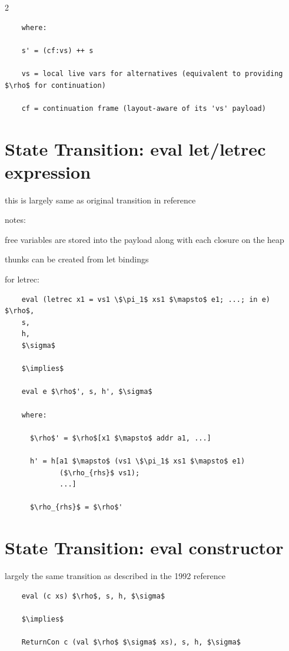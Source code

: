 \documentclass[8pt]{extarticle}
\begin{document}
\begin{multicols*}{2}
\begin{lstlisting}
    where:

    s' = (cf:vs) ++ s
    
    vs = local live vars for alternatives (equivalent to providing $\rho$ for continuation)
    
    cf = continuation frame (layout-aware of its 'vs' payload)
  \end{lstlisting}

  \section{State Transition: eval let/letrec expression}

  this is largely same as original transition in reference \cite{peyton1992}

  notes:

  free variables are stored into the payload along with each closure on the heap

  thunks can be created from let bindings
  
  for letrec:
  
  \begin{lstlisting}
    eval (letrec x1 = vs1 \$\pi_1$ xs1 $\mapsto$ e1; ...; in e) $\rho$,
    s,
    h,
    $\sigma$

    $\implies$

    eval e $\rho$', s, h', $\sigma$

    where:

      $\rho$' = $\rho$[x1 $\mapsto$ addr a1, ...]
      
      h' = h[a1 $\mapsto$ (vs1 \$\pi_1$ xs1 $\mapsto$ e1)
             ($\rho_{rhs}$ vs1);
             ...]

      $\rho_{rhs}$ = $\rho$'
  \end{lstlisting}

  \section{State Transition: eval constructor}

  largely the same transition as described in the 1992 reference \cite{peyton1992}

  \begin{lstlisting}
    eval (c xs) $\rho$, s, h, $\sigma$

    $\implies$

    ReturnCon c (val $\rho$ $\sigma$ xs), s, h, $\sigma$
  \end{lstlisting}

  \vfill\null
  \columnbreak


\end{multicols*}
\end{document}
